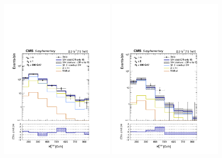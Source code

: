\clearpage
\begin{figure}[!h]
  \begin{center}
    \includegraphics[width=0.49\textwidth]{Supplementary/aggregated_mhtShape_le1b_ge5j_200_Inf_crfit_aux.pdf} 
    \includegraphics[width=0.49\textwidth]{Supplementary/aggregated_mhtShape_ge2b_ge5j_200_Inf_crfit_aux.pdf} \\
    \caption{
      \label{fig:aggr_high} 
    }
  \end{center}
\end{figure}

